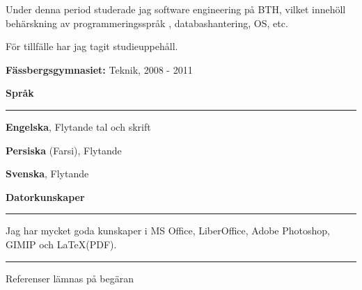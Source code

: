 \documentclass[12pt , a4paper]{article}
\begin{document}
\begin{flushleft}
		\vspace{3pt}
				
		Under denna period studerade jag software engineering på BTH,
		vilket innehöll behärskning av programmeringsspråk , databashantering, OS, etc. 
		
		
		För tillfälle har jag tagit studieuppehåll.
		
		\vspace{6pt}
		
		\textbf{Fässbergsgymnasiet: }Teknik, 2008 - 2011


	
		
		\vspace{12pt}
		{\large \textbf{Språk}}
		\hrule
		\vspace{12pt}

		\textbf{Engelska}, Flytande tal och skrift
		
		\textbf{Persiska} (Farsi), Flytande 

		\textbf{Svenska}, Flytande
		
		\vspace{12pt}
		{\large \textbf{Datorkunskaper}}
		\hrule
		\vspace{12pt}
		Jag har mycket goda kunskaper i MS Office, LiberOffice, Adobe Photoshop, GIMIP och LaTeX(PDF).
		\vspace{6pt}		
		\hrule
		\vspace{6pt}		
		
		Referenser lämnas på begäran

	\end{flushleft}		
	
	
\end{document}
